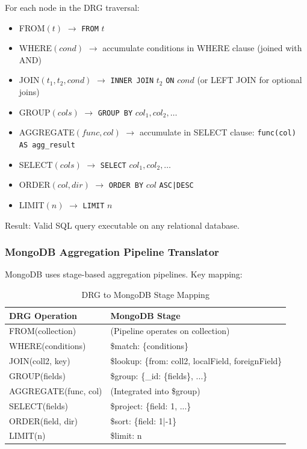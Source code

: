 \documentclass[conference]{IEEEtran}
\begin{document}
For each node in the DRG traversal:
\begin{itemize}
\item FROM$(t)$ $\to$ \texttt{FROM} $t$
\item WHERE$(cond)$ $\to$ accumulate conditions in WHERE clause (joined with AND)
\item JOIN$(t_1, t_2, cond)$ $\to$ \texttt{INNER JOIN} $t_2$ \texttt{ON} $cond$ (or LEFT JOIN for optional joins)
\item GROUP$(cols)$ $\to$ \texttt{GROUP BY} $col_1, col_2, \ldots$
\item AGGREGATE$(func, col)$ $\to$ accumulate in SELECT clause: \texttt{func(col) AS agg\_result}
\item SELECT$(cols)$ $\to$ \texttt{SELECT} $col_1, col_2, \ldots$
\item ORDER$(col, dir)$ $\to$ \texttt{ORDER BY} $col$ \texttt{ASC|DESC}
\item LIMIT$(n)$ $\to$ \texttt{LIMIT} $n$
\end{itemize}

Result: Valid SQL query executable on any relational database.

\subsubsection{MongoDB Aggregation Pipeline Translator}

MongoDB uses stage-based aggregation pipelines. Key mapping:

\begin{table}[t]
\caption{DRG to MongoDB Stage Mapping}
\begin{center}
\begin{tabular}{|l|l|}
\hline
\textbf{DRG Operation} & \textbf{MongoDB Stage} \\
\hline
FROM(collection) & (Pipeline operates on collection) \\
WHERE(conditions) & \$match: \{conditions\} \\
JOIN(coll2, key) & \$lookup: \{from: coll2, localField, foreignField\} \\
GROUP(fields) & \$group: \{\_id: \{fields\}, ...\} \\
AGGREGATE(func, col) & (Integrated into \$group) \\
SELECT(fields) & \$project: \{field: 1, ...\} \\
ORDER(field, dir) & \$sort: \{field: 1|-1\} \\
LIMIT(n) & \$limit: n \\
\hline
\end{tabular}
\label{tab:mql-mapping}
\end{center}
\end{table}
\end{document}
